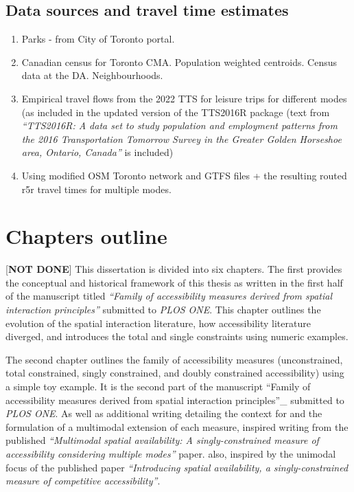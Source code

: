 \documentclass[
11pt, %
oneside, %
english, %
singlespacing, %
]{macthesis} %
\begin{document}
\subsection{Data sources and travel time estimates}\label{data-sources-and-travel-time-estimates}

\begin{enumerate}
\def\labelenumi{\arabic{enumi})}
\item
  Parks - from City of Toronto portal.
\item
  Canadian census for Toronto CMA. Population weighted centroids. Census data at the DA. Neighbourhoods.
\item
  Empirical travel flows from the 2022 TTS for leisure trips for different modes (as included in the updated version of the TTS2016R package (text from \emph{``TTS2016R: A data set to study population and employment patterns from the 2016 Transportation Tomorrow Survey in the Greater Golden Horseshoe area, Ontario, Canada''} is included)
\item
  Using modified OSM Toronto network and GTFS files + the resulting routed r5r travel times for multiple modes.
\end{enumerate}

\section{Chapters outline}\label{chapters-outline}

{[}\textbf{NOT DONE}{]}
This dissertation is divided into six chapters. The first provides the conceptual and historical framework of this thesis as written in the first half of the manuscript titled \emph{``Family of accessibility measures derived from spatial interaction principles''} submitted to \emph{PLOS ONE}. This chapter outlines the evolution of the spatial interaction literature, how accessibility literature diverged, and introduces the total and single constraints using numeric examples.

The second chapter outlines the family of accessibility measures (unconstrained, total constrained, singly constrained, and doubly constrained accessibility) using a simple toy example. It is the second part of the manuscript ``Family of accessibility measures derived from spatial interaction principles''\_ submitted to \emph{PLOS ONE}. As well as additional writing detailing the context for and the formulation of a multimodal extension of each measure, inspired writing from the published \emph{``Multimodal spatial availability: A singly-constrained measure of accessibility considering multiple modes''} paper. also, inspired by the unimodal focus of the published paper \emph{``Introducing spatial availability, a singly-constrained measure of competitive accessibility''}.
\end{document}
